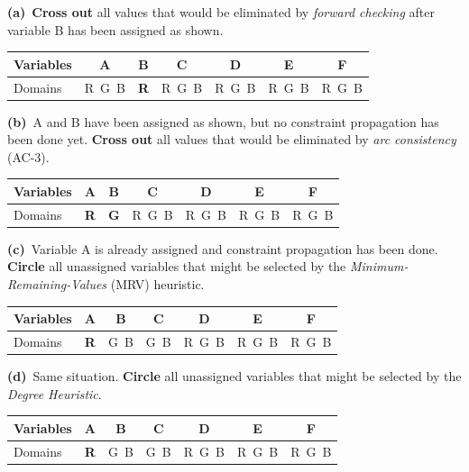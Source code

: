 \documentclass[11pt,a4paper]{article}
\newcommand{\subq}[1]{\par\smallskip\noindent\textbf{#1}\ }
\begin{document}
\subq{(a)}\textbf{Cross out} all values that would be eliminated by \emph{forward checking} after variable B has been assigned as shown.\begin{center}\small\begin{tabular}{|l|c|c|c|c|c|c|}\hline Variables & \textbf{A} & \textbf{B} & \textbf{C} & \textbf{D} & \textbf{E} & \textbf{F}\\ \hline Domains & R\ G\ B & \textbf{R} & R\ G\ B & R\ G\ B & R\ G\ B & R\ G\ B\\ \hline\end{tabular}\end{center}

\subq{(b)}A and B have been assigned as shown, but no constraint propagation has been done yet. \textbf{Cross out} all values that would be eliminated by \emph{arc consistency} (AC-3).\begin{center}\small\begin{tabular}{|l|c|c|c|c|c|c|}\hline Variables & \textbf{A} & \textbf{B} & \textbf{C} & \textbf{D} & \textbf{E} & \textbf{F}\\ \hline Domains & \textbf{R} & \textbf{G} & R\ G\ B & R\ G\ B & R\ G\ B & R\ G\ B\\ \hline\end{tabular}\end{center}

\subq{(c)}Variable A is already assigned and constraint propagation has been done. \textbf{Circle} all unassigned variables that might be selected by the \emph{Minimum-Remaining-Values} (MRV) heuristic.\begin{center}\small\begin{tabular}{|l|c|c|c|c|c|c|}\hline Variables & \textbf{A} & \textbf{B} & \textbf{C} & \textbf{D} & \textbf{E} & \textbf{F}\\ \hline Domains & \textbf{R} & G\ B & G\ B & R\ G\ B & R\ G\ B & R\ G\ B\\ \hline\end{tabular}\end{center}

\subq{(d)}Same situation. \textbf{Circle} all unassigned variables that might be selected by the \emph{Degree Heuristic}.\begin{center}\small\begin{tabular}{|l|c|c|c|c|c|c|}\hline Variables & \textbf{A} & \textbf{B} & \textbf{C} & \textbf{D} & \textbf{E} & \textbf{F}\\ \hline Domains & \textbf{R} & G\ B & G\ B & R\ G\ B & R\ G\ B & R\ G\ B\\ \hline\end{tabular}\end{center}
\end{document}
